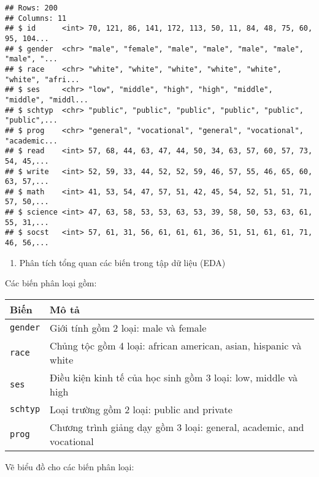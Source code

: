 \documentclass[
]{article}
\newenvironment{Shaded}{\begin{snugshade}}{\end{snugshade}}
\newcommand{\CommentTok}[1]{\textcolor[rgb]{0.56,0.35,0.01}{\textit{#1}}}
\newcommand{\KeywordTok}[1]{\textcolor[rgb]{0.13,0.29,0.53}{\textbf{#1}}}
\newcommand{\NormalTok}[1]{#1}
\newcommand{\OperatorTok}[1]{\textcolor[rgb]{0.81,0.36,0.00}{\textbf{#1}}}
\newcommand{\StringTok}[1]{\textcolor[rgb]{0.31,0.60,0.02}{#1}}
\providecommand{\tightlist}{%
  \setlength{\itemsep}{0pt}\setlength{\parskip}{0pt}}
\begin{document}
\begin{verbatim}
## Rows: 200
## Columns: 11
## $ id      <int> 70, 121, 86, 141, 172, 113, 50, 11, 84, 48, 75, 60, 95, 104...
## $ gender  <chr> "male", "female", "male", "male", "male", "male", "male", "...
## $ race    <chr> "white", "white", "white", "white", "white", "white", "afri...
## $ ses     <chr> "low", "middle", "high", "high", "middle", "middle", "middl...
## $ schtyp  <chr> "public", "public", "public", "public", "public", "public",...
## $ prog    <chr> "general", "vocational", "general", "vocational", "academic...
## $ read    <int> 57, 68, 44, 63, 47, 44, 50, 34, 63, 57, 60, 57, 73, 54, 45,...
## $ write   <int> 52, 59, 33, 44, 52, 52, 59, 46, 57, 55, 46, 65, 60, 63, 57,...
## $ math    <int> 41, 53, 54, 47, 57, 51, 42, 45, 54, 52, 51, 51, 71, 57, 50,...
## $ science <int> 47, 63, 58, 53, 53, 63, 53, 39, 58, 50, 53, 63, 61, 55, 31,...
## $ socst   <int> 57, 61, 31, 56, 61, 61, 61, 36, 51, 51, 61, 61, 71, 46, 56,...
\end{verbatim}

\begin{enumerate}
\def\labelenumi{\arabic{enumi}.}
\setcounter{enumi}{1}
\tightlist
\item
  Phân tích tổng quan các biến trong tập dữ liệu (EDA)
\end{enumerate}

Các biến phân loại gồm:

\begin{longtable}[]{@{}ll@{}}
\toprule
Biến & Mô tả\tabularnewline
\midrule
\endhead
\texttt{gender} & Giới tính gồm 2 loại: male và female\tabularnewline
\texttt{race} & Chủng tộc gồm 4 loại: african american, asian, hispanic
và white\tabularnewline
\texttt{ses} & Điều kiện kinh tế của học sinh gồm 3 loại: low, middle và
high\tabularnewline
\texttt{schtyp} & Loại trường gồm 2 loại: public and
private\tabularnewline
\texttt{prog} & Chương trình giảng dạy gồm 3 loại: general, academic,
and vocational\tabularnewline
\bottomrule
\end{longtable}

Vẽ biểu đồ cho các biến phân loại:

\begin{Shaded}
\end{Shaded}
\end{document}
